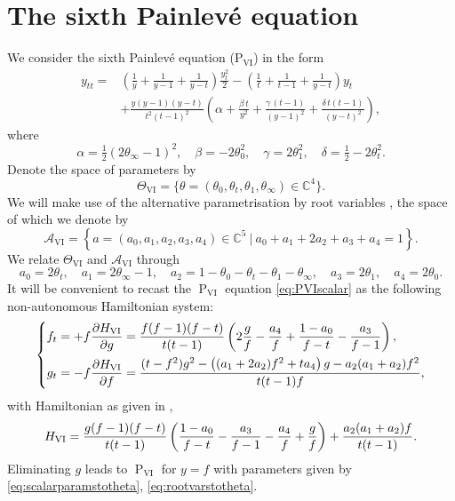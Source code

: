 \documentclass[a4paper,reqno]{amsart}
\numberwithin{equation}{section}
\newcommand\Psix{\textrm{P}_{\textrm{VI}}}
\newcommand{\pain}[1]{\operatorname{P}_{\mathrm{#1}}}
\numberwithin{equation}{section}
\begin{document}
\section{The sixth Painlev\'e equation} \label{sec:PVI}
We consider the sixth Painlev\'e equation ($\Psix$) in the form
\begin{equation} \label{eq:PVIscalar}
\begin{aligned}
y_{tt}=&\left(\frac{1}{y}+\frac{1}{y-1}+\frac{1}{y-t}\right)\frac{y_t^2}{2}-\left(\frac{1}{t}+\frac{1}{t-1}+\frac{1}{y-t}\right)y_t\\
&+\frac{y(y-1)(y-t)}{t^2(t-1)^2}\left(\alpha+\frac{\beta\, t}{y^2}+\frac{\gamma\,(t-1)}{(y-1)^2}+\frac{\delta \,t(t-1)}{(y-t)^2}\right),
\end{aligned}
\end{equation}
where
\begin{equation} \label{eq:scalarparamstotheta}
    \alpha=\tfrac{1}{2}(2\theta_\infty-1)^2,\quad \beta=-2\theta_0^2,\quad \gamma =2\theta_1^2,\quad \delta=\tfrac{1}{2}-2\theta_t^2.
\end{equation}
Denote the space of parameters by
\begin{equation*}
    \Theta_{\mathrm{VI}}=\{\theta = (\theta_0,\theta_t,\theta_1,\theta_\infty)\in\mathbb{C}^4\}.
\end{equation*}
We will make use of the alternative parametrisation by root variables \cite{sakai2001}, the space of which we denote by
\begin{equation*}
\mathscr{A}_{\mathrm{VI}} = \left\{a = (a_0,a_1,a_2,a_3,a_4) \in \mathbb{C}^5 ~|~ a_0 +a_1 +2 a_2 + a_3 + a_4 = 1 \right\}.
\end{equation*}
We relate $\Theta_{\mathrm{VI}}$ and $\mathscr{A}_{\mathrm{VI}}$ through
\begin{equation} \label{eq:rootvarstotheta}
    a_0 =  2 \theta_t, \quad 
    a_1 = 2 \theta_{\infty } -1 ,\quad 
    a_2 =1 -\theta_0-\theta_t-\theta_1 -\theta_{\infty }, \quad 
    a_3 = 2 \theta _1, \quad 
    a_4 =  2 \theta _0.
\end{equation}
It will be convenient to recast the $\pain{VI}$ equation \eqref{eq:PVIscalar} as the following non-autonomous Hamiltonian system:
\begin{equation} \label{eq:hamiltoniansystempvi}
    \left\{
    \begin{aligned}
        f_t &=+f \frac{\partial H_{\rm VI}}{\partial g} = \frac{f(f-1)(f-t)}{t (t-1)}\left(2\frac{g}{f}-\frac{a_4}{f}+\frac{1-a_0}{f-t} - \frac{a_3}{f-1}\right), \\
        g_t &= - f \frac{\partial H_{\rm VI}}{\partial f} = \frac{( t- f^2)g^2 - \left( (a_1+2a_2)f^2 +  t a_4\right)g - a_2(a_1+a_2) f^2  }{t(t-1)f},
    \end{aligned}
    \right.    
\end{equation} 
with Hamiltonian as given in \cite{KNY},
\begin{equation*}
            H_{\rm VI} = \frac{g(f-1)(f-t)}{t (t-1)}\left(\frac{1-a_0}{f-t} - \frac{a_3}{f-1}-\frac{a_4}{f}+\frac{g}{f} \right) + \frac{a_2(a_1+a_2)f}{t(t-1)}    .
\end{equation*}
Eliminating $g$ leads to $\pain{VI}$ for $y=f$ with parameters given by \eqref{eq:scalarparamstotheta}, \eqref{eq:rootvarstotheta}.
\end{document}
